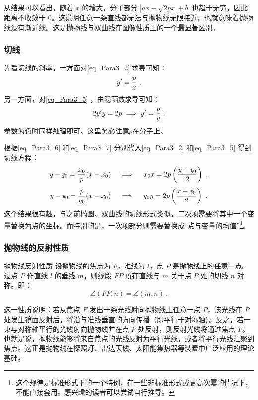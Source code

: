 从结果可以看出，随着 $x$ 的增大，分子部分 $|ax - \sqrt{2px} + b|$ 也趋于无穷，因此距离不收敛于 $0$。这说明任意一条直线都无法与抛物线无限接近，也就意味着抛物线没有渐近线。这是抛物线与双曲线在图像性质上的一个最显著区别。

\subsubsection{切线}

先看切线的斜率，一方面对\autoref{eq_Para3_2} 求导可知：
\begin{equation}\label{eq_Para3_6}
y'={p\over x}~.
\end{equation}
另一方面，对\autoref{eq_Para3_5} ，由隐函数求导可知：
\begin{equation}\label{eq_Para3_7}
2y'y=2p\implies y'={p\over y}~.
\end{equation}
参数为负时同样处理即可。这里务必注意$p$在分子上。

根据\autoref{eq_Para3_6} 和\autoref{eq_Para3_7} 分别代入\autoref{eq_Para3_2} 和\autoref{eq_Para3_5} 得到切线方程：
\begin{equation}
y-y_0={x_0\over p}(x-x_0)\quad\implies\quad x_0x=2p\left(\frac{y+y_0}{2}\right)~.
\end{equation}
\begin{equation}
y-y_0={p\over y_0}(x-x_0)\quad\implies\quad y_0y=2p\left(\frac{x+x_0}{2}\right)~.
\end{equation}
这个结果很有趣，与之前椭圆、双曲线的切线形式类似，二次项需要将其中一个变量替换为点的坐标。而特别的是，一次项部分则需要替换成“点与变量的均值”\footnote{这个规律是标准形式下的一个特例，在一些非标准形式或更高次幂的情况下，不能直接套用。感兴趣的读者可以尝试自行推导。}。

\subsubsection{抛物线的反射性质}

\begin{theorem}{抛物线反射性质}
设抛物线的焦点为 $F$，准线为 $l$，点 $P$ 是抛物线上的任意一点。过点 $P$ 作直线 $l$ 的垂线 $m$，则线段 $FP$ 所在直线与 $m$ 关于点 $P$ 处的切线 $n$ 对称。即：
\begin{equation}
\angle(FP, n) = \angle(m, n)~.
\end{equation}
\end{theorem}

这一性质说明：若从焦点 $F$ 发出一条光线射向抛物线上任意一点 $P$，该光线在 $P$ 处发生镜面反射后，将沿与准线垂直的方向传播（即平行于对称轴）。反之，若一束与对称轴平行的光线射向抛物线并在点 $P$ 处反射，则反射光线将通过焦点 $F$。也就是说，抛物线能够将来自焦点的光线反射为平行光线，或者将平行光线汇聚到焦点。这正是抛物线在探照灯、雷达天线、太阳能集热器等装置中广泛应用的理论基础。

